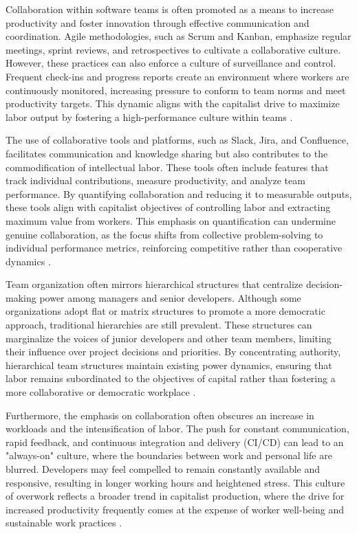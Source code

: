 \begin{refsection}
Collaboration within software teams is often promoted as a means to increase productivity and foster innovation through effective communication and coordination. Agile methodologies, such as Scrum and Kanban, emphasize regular meetings, sprint reviews, and retrospectives to cultivate a collaborative culture. However, these practices can also enforce a culture of surveillance and control. Frequent check-ins and progress reports create an environment where workers are continuously monitored, increasing pressure to conform to team norms and meet productivity targets. This dynamic aligns with the capitalist drive to maximize labor output by fostering a high-performance culture within teams \cite[pp.~155-158]{Sutherland2021Scrum}.

The use of collaborative tools and platforms, such as Slack, Jira, and Confluence, facilitates communication and knowledge sharing but also contributes to the commodification of intellectual labor. These tools often include features that track individual contributions, measure productivity, and analyze team performance. By quantifying collaboration and reducing it to measurable outputs, these tools align with capitalist objectives of controlling labor and extracting maximum value from workers. This emphasis on quantification can undermine genuine collaboration, as the focus shifts from collective problem-solving to individual performance metrics, reinforcing competitive rather than cooperative dynamics \cite[pp.~89-91]{DeMarco2013Peopleware}.

Team organization often mirrors hierarchical structures that centralize decision-making power among managers and senior developers. Although some organizations adopt flat or matrix structures to promote a more democratic approach, traditional hierarchies are still prevalent. These structures can marginalize the voices of junior developers and other team members, limiting their influence over project decisions and priorities. By concentrating authority, hierarchical team structures maintain existing power dynamics, ensuring that labor remains subordinated to the objectives of capital rather than fostering a more collaborative or democratic workplace \cite[pp.~132-135]{Edwards1980ContestedTerrain}.

Furthermore, the emphasis on collaboration often obscures an increase in workloads and the intensification of labor. The push for constant communication, rapid feedback, and continuous integration and delivery (CI/CD) can lead to an "always-on" culture, where the boundaries between work and personal life are blurred. Developers may feel compelled to remain constantly available and responsive, resulting in longer working hours and heightened stress. This culture of overwork reflects a broader trend in capitalist production, where the drive for increased productivity frequently comes at the expense of worker well-being and sustainable work practices \cite[pp.~75-78]{Beck2021ExtremeProgramming}.


\end{refsection}
